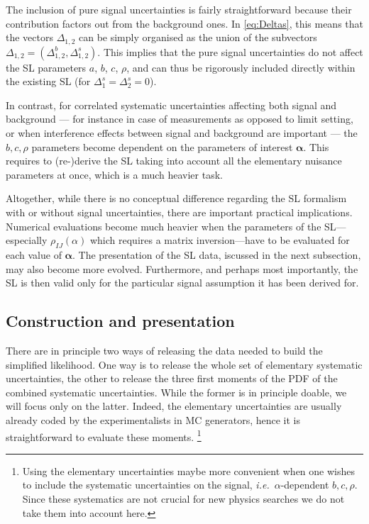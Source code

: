 \documentclass[11pt]{article}
\def\ie{{\it i.e.}}
\begin{document}
The inclusion of pure signal uncertainties is fairly straightforward because their contribution factors out from the background ones. 
In \eqref{eq:Deltas}, this means that the vectors $\Delta_{1,2}$ can be simply organised as the union of the subvectors $\Delta_{1,2}=(\Delta^b_{1,2},\Delta^s_{1,2})$. 
This implies that the pure signal uncertainties do not affect the SL parameters $a$, $b$, $c$, $\rho$, and can thus be rigorously included directly within the existing SL (for $\Delta_{1}^s=\Delta_{2}^s=0$).

In contrast, for correlated systematic uncertainties affecting both signal and background --- for instance in case of measurements as opposed to limit setting, or when interference effects between signal and background are important --- 
the $b,c,\rho$ parameters  become dependent on the parameters of interest ${\bm \alpha}$.  
This requires to (re-)derive the SL taking into account all the elementary nuisance parameters at once, which is a much heavier task. 

Altogether, while there is no conceptual difference regarding the SL formalism with or without signal uncertainties, there are important practical implications. Numerical evaluations become much heavier when the parameters of the SL---especially $\rho_{IJ}(\alpha)$ which requires a matrix inversion---have to be evaluated for each value of ${\bm \alpha}$.  The presentation of the SL data, iscussed in the next subsection, may also become more evolved.  
Furthermore, and perhaps most importantly, the SL is then valid only for the particular signal assumption it has been derived for. 




\subsection{Construction and  presentation}


There are in principle two ways of releasing the data needed to build the simplified likelihood. One way %
is to release the whole set of elementary systematic uncertainties, the other to release the three first moments of the PDF of the combined systematic uncertainties. While the former is in principle doable, we will focus only on the latter. Indeed, the elementary uncertainties are usually already  coded by the experimentalists in MC generators, hence it is straightforward to evaluate these moments.%
\footnote{Using the elementary uncertainties maybe more convenient when one wishes to include the systematic uncertainties on the signal, \ie\  $\alpha$-dependent $b,c,\rho$. Since these systematics are not crucial for new physics searches we do not take them into account here.}
\end{document}

